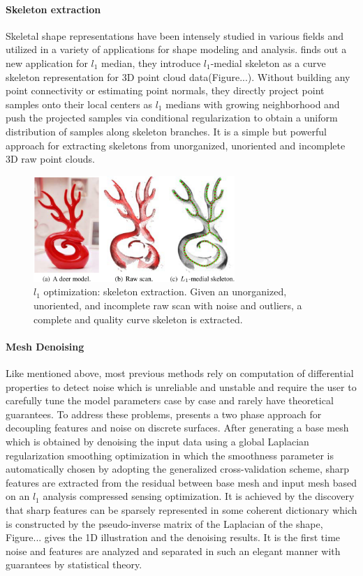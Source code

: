\paragraph{Skeleton extraction}Skeletal shape representations have been intensely studied in various fields and utilized in a variety of applications for shape modeling and analysis. \cite{huang2013l1} finds out a new application for $l_1$ median, they introduce $l_1$-medial skeleton as a curve skeleton representation for 3D point cloud data(Figure...). Without building any point connectivity or estimating point normals, they directly project point samples onto their local centers as $l_1$ medians with growing neighborhood and push the projected samples via conditional regularization to obtain a uniform distribution of samples along skeleton branches. It is a simple but powerful approach for extracting skeletons from unorganized, unoriented and incomplete 3D raw point clouds.

\begin{figure}[ht]
  \centering
  \includegraphics[width=3in]{images/skeleton_L1}
  \caption{$l_1$ optimization: skeleton extraction\cite{huang2013l1}. Given an unorganized, unoriented, and incomplete raw scan with noise and outliers, a complete and quality curve skeleton is extracted.}
\end{figure}

\paragraph{Mesh Denoising} Like \cite{he2013mesh} mentioned above, most previous methods rely on computation of differential properties to detect noise which is unreliable and unstable and require the user to carefully tune the model parameters case by case and rarely have theoretical guarantees. To address these problems, \cite{wang2014decoupling} presents a two phase approach for decoupling features and noise on discrete surfaces. After generating a base mesh which is obtained by denoising the input data using a global Laplacian regularization smoothing optimization in which the smoothness parameter is automatically chosen by adopting the generalized cross-validation scheme, sharp features are extracted from the residual between base mesh and input mesh based on an $l_1$ analysis compressed sensing optimization. It is achieved by the discovery that sharp features can be sparsely represented in some coherent dictionary which is constructed by the pseudo-inverse matrix of the Laplacian of the shape, Figure... gives the 1D illustration and the denoising results. It is the first time noise and features are analyzed and separated in such an elegant manner with guarantees by statistical theory.

